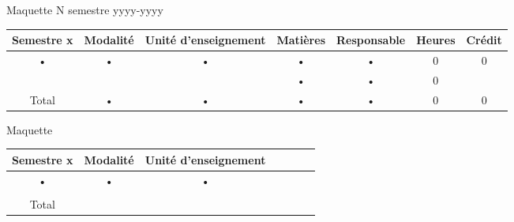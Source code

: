\documentclass[12pt,a4paper,landscape]{article}
\begin{document}
\begin{center}
\begin{LARGE}
Maquette N semestre yyyy-yyyy
\end{LARGE}
\end{center}
\begin{center}
\begin{tabular}{|c|c|c|c|c|c|c|}
\hline 
Semestre x & Modalité & Unité d'enseignement & Matières & Responsable & Heures & Crédit \\ 
\hline
• & • & • & • & • & 0 & 0 \\ 
 &  &  & • & • & 0 &  \\
\hline
Total & • & • & • & • & 0 & 0 \\ 
\hline 
\end{tabular} 

\end{center}


\begin{center}
\begin{LARGE}
Maquette 
\end{LARGE}
\end{center}
\begin{center}
\begin{tabular}{|c|c|c|c|c|c|c|}
\hline 
Semestre x & Modalité & Unité d'enseignement  \\ 
\hline
• & • & • \\ 
 &  &   \\
\hline
Total &  &   \\ 
\hline 
\end{tabular} 

\end{center}
\end{document}
